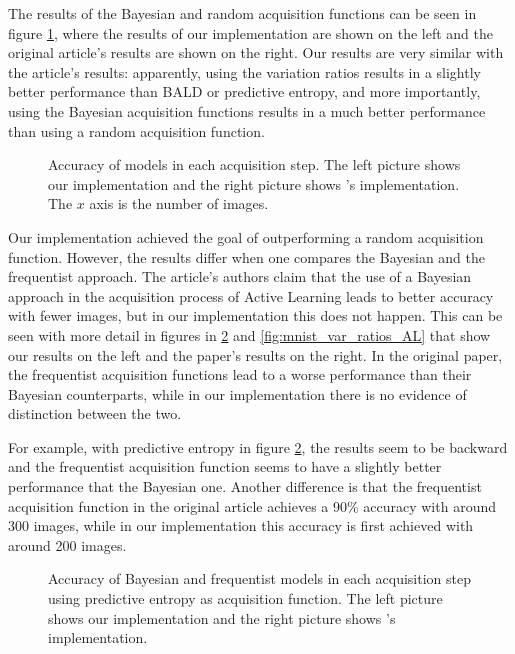 The results of the Bayesian and random acquisition functions can be seen in figure \ref{fig:mnist_comparison_active_learning_random}, where the results of our implementation are shown on the left and the original article's results are shown on the right. Our results are very similar with the article's results: apparently, using the variation ratios results in a slightly better performance than BALD or predictive entropy, and more importantly, using the Bayesian acquisition functions results in a much better performance than using a random acquisition function.

\begin{figure}[H]
    \centering
    \hfill
    \caption{Accuracy of models in each acquisition step. The left picture shows our implementation and the right picture shows \citeauthor{Gal2016Active}'s implementation. The $x$ axis is the number of images.}
    \label{fig:mnist_comparison_active_learning_random}
\end{figure}

Our implementation achieved the goal of outperforming a random acquisition function. However, the results differ when one compares the Bayesian and the frequentist approach. The article's authors claim that the use of a Bayesian approach in the acquisition process of Active Learning leads to better accuracy with fewer images, but in our implementation this does not happen. This can be seen with more detail in figures in \ref{fig:mnist_pred_entropy_AL} and \ref{fig:mnist_var_ratios_AL} that show our results on the left and the paper's results on the right. In the original paper, the frequentist acquisition functions lead to a worse performance than their Bayesian counterparts, while in our implementation there is no evidence of distinction between the two.

For example, with predictive entropy in figure \ref{fig:mnist_pred_entropy_AL}, the results seem to be backward and the frequentist acquisition function seems to have a slightly better performance that the Bayesian one. Another difference is that the frequentist acquisition function in the original article achieves a 90\% accuracy with around 300 images, while in our implementation this accuracy is first achieved with around 200 images.

\begin{figure}[H]
  \centering
  \hfill
  \caption{Accuracy of Bayesian and frequentist models in each acquisition step using predictive entropy as acquisition function. The left picture shows our implementation and the right picture shows \citeauthor{Gal2016Active}'s implementation.}
  \label{fig:mnist_pred_entropy_AL}
\end{figure}

